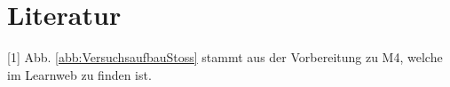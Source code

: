 \documentclass[11pt,a4paper,titlepage, ngerman]{article}
\begin{document}
	\section*{Literatur}
	
	
	[1] Abb. \ref*{abb:VersuchsaufbauStoss} stammt aus der Vorbereitung zu M4, welche im Learnweb zu finden ist.
	
\end{document}
